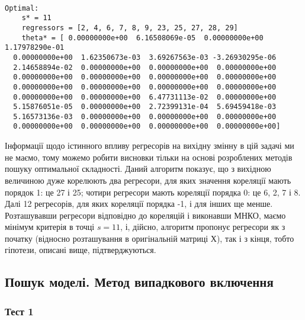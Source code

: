 \documentclass[11pt]{article}
\begin{document}
    \begin{center}
    \end{center}
    { \hspace*{\fill} \\}
    
    \begin{Verbatim}[commandchars=\\\{\}]
Optimal:
	s* = 11
	regressors = [2, 4, 6, 7, 8, 9, 23, 25, 27, 28, 29]
	theta* = [ 0.00000000e+00  6.16508069e-05  0.00000000e+00  1.17978290e-01
  0.00000000e+00  1.62350673e-03  3.69267563e-03 -3.26930295e-06
  2.14658894e-02  0.00000000e+00  0.00000000e+00  0.00000000e+00
  0.00000000e+00  0.00000000e+00  0.00000000e+00  0.00000000e+00
  0.00000000e+00  0.00000000e+00  0.00000000e+00  0.00000000e+00
  0.00000000e+00  0.00000000e+00  6.47731113e-02  0.00000000e+00
  5.15876051e-05  0.00000000e+00  2.72399131e-04  5.69459418e-03
  5.16573136e-03  0.00000000e+00  0.00000000e+00  0.00000000e+00
  0.00000000e+00  0.00000000e+00  0.00000000e+00  0.00000000e+00]

    \end{Verbatim}

    Інформації щодо істинного впливу регресорів на вихідну змінну в цій
задачі ми не маємо, тому можемо робити висновки тільки на основі
розроблених методів пошуку оптимальної складності. Даний алгоритм
показує, що з вихідною величиною дуже корелюють два регресори, для яких
значення кореляції мають порядок 1: це 27 і 25; чотири регресори мають
кореляції порядка 0: це 6, 2, 7 і 8. Далі 12 регресорів, для яких
кореляції порядка -1, і для інших ще менше. Розташувавши регресори
відповідно до кореляцій і виконавши МНКО, маємо мінімум критерія в точці
\(s=11\), і, дійсно, алгоритм пропонує регресори як з початку (відносно
розташування в оригінальній матриці Х), так і з кінця, тобто гіпотези,
описані вище, підтверджуються.

    \subsection{Пошук моделі. Метод випадкового
включення}\label{ux43fux43eux448ux443ux43a-ux43cux43eux434ux435ux43bux456.-ux43cux435ux442ux43eux434-ux432ux438ux43fux430ux434ux43aux43eux432ux43eux433ux43e-ux432ux43aux43bux44eux447ux435ux43dux43dux44f}

    \subsubsection{Тест 1}\label{ux442ux435ux441ux442-1}
\end{document}
